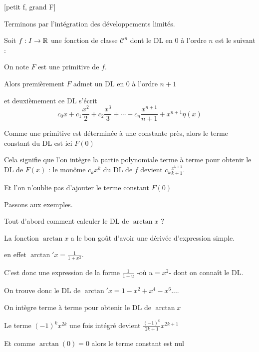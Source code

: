 \diapo

[petit f, grand F]

Terminons par l'intégration des développements limités.

Soit $f : I\to \mathbb{R}$ une fonction de classe $\mathcal{C}^n$ dont le DL 
en $0$ à l'ordre $n$ est le suivant :

\change

On note $F$ est une primitive de $f$.

Alors premièrement $F$ admet un DL en $0$ à l'ordre $n+1$ 

\change

et deuxièmement ce DL s'écrit 
$$c_0x+c_1\frac{x^2}{2}+ c_2\frac{x^3}{3}+\cdots+c_n\frac{x^{n+1}}{n+1} 
+x^{n+1}\eta(x)$$  

\change

Comme une primitive est déterminée à une constante près,
alors le terme constant du DL est ici  $F(0)$

\change

Cela signifie que l'on intègre la partie polynomiale terme à terme pour obtenir le DL de $F(x)$ :
le monôme $c_k x^k$ du DL de $f$ devient
$c_k\frac{x^{k+1}}{k+1}$.

Et l'on n'oublie pas d'ajouter le terme constant $F(0)$




\diapo

Passons aux exemples.

Tout d'abord comment calculer le DL de $\arctan x$ ?

La fonction $\arctan x$ a le bon goût d'avoir une dérivée d'expression simple.

\change

en effet $\arctan' x=\frac{1}{1+x^2}$. 

\change

C'est donc une expression de la forme $\frac{1}{1+u}$ -où $u=x^2$-
dont on connaît le DL.

On trouve donc le DL de $\arctan' x=1-x^2+x^4-x^6...$.

\change

On intègre terme à terme pour obtenir 
le DL de $\arctan x$

Le terme $(-1)^kx^{2k}$ une fois intégré devient $\frac{(-1)^k}{2k+1}x^{2k+1}$

\change

Et comme $\arctan(0)=0$ alors le terme constant est nul


